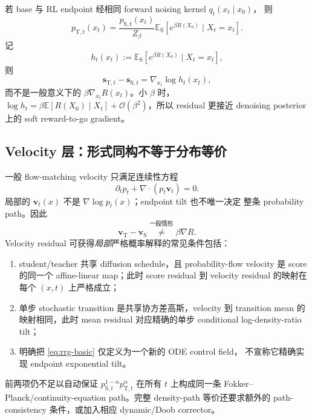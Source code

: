 \documentclass[11pt,a4paper]{article}
\newcommand{\E}{\mathbb{E}}
\newcommand{\score}{\bm{s}}
\newcommand{\vfield}{\bm{v}}
\newcommand{\student}{\mathrm{S}}
\newcommand{\teacher}{\mathrm{T}}
\theoremstyle{definition}
\theoremstyle{plain}
\begin{document}
若 base 与 RL endpoint 经相同 forward noising kernel $q_t(x_t\mid x_0)$，
则
\begin{equation}
  p_{\teacher,t}(x_t)
  =
  \frac{p_{\student,t}(x_t)}{Z_\beta}
  \E_{\student}\!\left[
    e^{\beta R(X_0)}\mid X_t=x_t
  \right].
  \label{eq:noisy-tilt}
\end{equation}
记
\begin{equation}
  h_t(x_t)
  :=
  \E_{\student}\!\left[
    e^{\beta R(X_0)}\mid X_t=x_t
  \right],
  \label{eq:soft-value}
\end{equation}
则
\begin{equation}
  \score_{\teacher,t}-\score_{\student,t}
  =
  \nabla_{x_t}\log h_t(x_t),
  \label{eq:noisy-score-residual}
\end{equation}
而不是一般意义下的 $\beta\nabla_{x_t}R(x_t)$。小 $\beta$ 时，
$\log h_t=\beta\E[R(X_0)\mid X_t]+\mathcal O(\beta^2)$，所以 residual
更接近 denoising posterior 上的 soft reward-to-go gradient。

\subsection{Velocity 层：形式同构不等于分布等价}

一般 flow-matching velocity 只满足连续性方程
\begin{equation}
  \partial_t p_t+\nabla\cdot(p_t\vfield_t)=0.
  \label{eq:continuity}
\end{equation}
局部的 $\vfield_t(x)$ 不是 $\nabla\log p_t(x)$；endpoint tilt 也不唯一决定
整条 probability path。因此
\begin{equation}
  \vfield_\teacher-\vfield_\student
  \stackrel{\text{一般情形}}{\neq}
  \beta\nabla R.
  \label{eq:not-general-reward-gradient}
\end{equation}
Velocity residual 可获得\emph{局部}严格概率解释的常见条件包括：
\begin{enumerate}[leftmargin=1.6em]
  \item student/teacher 共享 diffusion schedule，且 probability-flow velocity
  是 score 的同一个 affine-linear map；此时 score residual 到 velocity residual
  的映射在每个 $(x,t)$ 上严格成立；
  \item 单步 stochastic transition 是共享协方差高斯，velocity 到 transition
  mean 的映射相同，此时 mean residual 对应精确的单步 conditional
  log-density-ratio tilt；
  \item 明确把 \eqref{eq:rrg-basic} 仅定义为一个新的 ODE control field，
  不宣称它精确实现 endpoint exponential tilt。
\end{enumerate}
前两项仍不足以自动保证
$p_{\student,t}^{1-\alpha}p_{\teacher,t}^{\alpha}$ 在所有 $t$ 上构成同一条
Fokker--Planck/continuity-equation path。完整 density-path 等价还要求额外的
path-consistency 条件，或加入相应 dynamic/Doob corrector。
\end{document}
